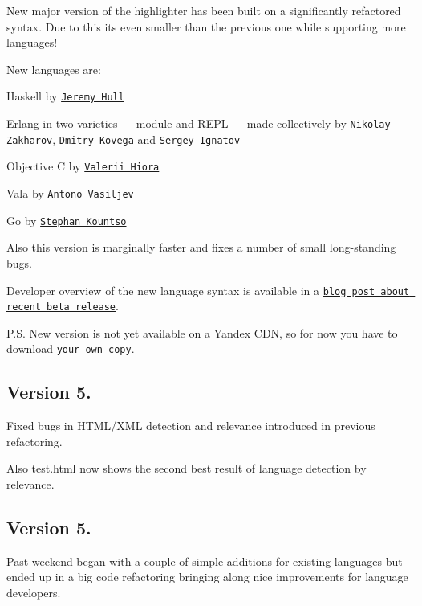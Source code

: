 New major version of the highlighter has been built on a significantly refactored syntax. Due to this it\textquotesingle{}s even smaller than the previous one while supporting more languages!

New languages are\+:


\begin{DoxyItemize}
\item Haskell by \href{https://github.com/sourrust}{\tt Jeremy Hull}
\item Erlang in two varieties — module and R\+E\+PL — made collectively by \href{http://desh.su/}{\tt Nikolay Zakharov}, \href{https://github.com/arhibot}{\tt Dmitry Kovega} and \href{https://github.com/ignatov}{\tt Sergey Ignatov}
\item Objective C by \href{https://github.com/vhbit}{\tt Valerii Hiora}
\item Vala by \href{https://github.com/antono}{\tt Antono Vasiljev}
\item Go by \href{https://github.com/steplg}{\tt Stephan Kountso}
\end{DoxyItemize}

Also this version is marginally faster and fixes a number of small long-\/standing bugs.

Developer overview of the new language syntax is available in a \href{http://softwaremaniacs.org/blog/2011/04/25/highlight-js-60-beta/en/}{\tt blog post about recent beta release}.

P.\+S. New version is not yet available on a Yandex C\+DN, so for now you have to download \href{/soft/highlight/en/download/}{\tt your own copy}.

\subsection*{Version 5.}

Fixed bugs in H\+T\+M\+L/\+X\+ML detection and relevance introduced in previous refactoring.

Also test.\+html now shows the second best result of language detection by relevance.

\subsection*{Version 5.}

Past weekend began with a couple of simple additions for existing languages but ended up in a big code refactoring bringing along nice improvements for language developers.

